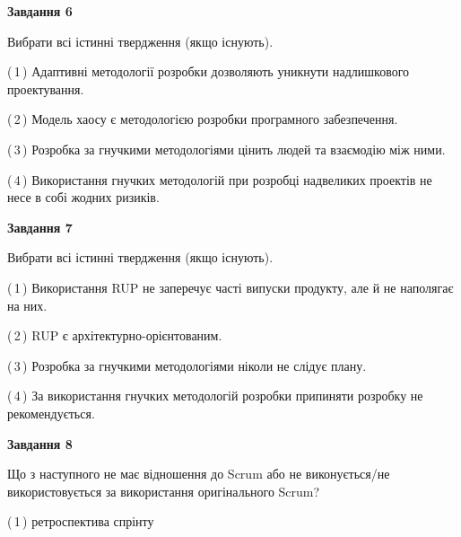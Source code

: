 \documentclass[10pt, ukrainian]{article}
\begin{document}
{\begin {large}
{\begin {center}\textbf{Завдання 6}\end {center}}\par
Вибрати всі істинні твердження (якщо існують).\par
\vspace{2mm}



(\,1\,) Адаптивні методології розробки дозволяють уникнути надлишкового проектування. %



(\,2\,) Модель хаосу є методологією розробки програмного забезпечення. %



(\,3\,) Розробка за гнучкими методологіями цінить людей та взаємодію між ними. %



(\,4\,) Використання гнучких методологій при розробці надвеликих проектів не несе в собі жодних ризиків. %


{\begin {center}\textbf{Завдання 7}\end {center}}\par
Вибрати всі істинні твердження (якщо існують).\par
\vspace{2mm}



(\,1\,) Використання RUP не заперечує часті випуски продукту, але й не наполягає на них. %



(\,2\,) RUP є архітектурно-орієнтованим. %



(\,3\,) Розробка за гнучкими методологіями ніколи не слідує плану. %



(\,4\,) За використання гнучких методологій розробки припиняти розробку не рекомендується. %


{\begin {center}\textbf{Завдання 8}\end {center}}\par
Що з наступного не має відношення до Scrum або не виконується/не використовується за використання оригінального Scrum?\par
\vspace{2mm}



(\,1\,) ретроспектива спрінту%




\end{large}}
\end{document}
